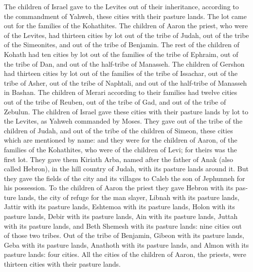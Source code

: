 \begin{paracol}{2}
\begin{otherlanguage}{english}
 The children of Israel gave to the Levites out of their
inheritance, according to the commandment of Yahweh, these cities with
their pasture lands.  The lot came out for the families of
the Kohathites. The children of Aaron the priest, who were of the
Levites, had thirteen cities by lot out of the tribe of Judah, out of
the tribe of the Simeonites, and out of the tribe of Benjamin.
 The rest of the children of Kohath had ten cities by lot
out of the families of the tribe of Ephraim, out of the tribe of Dan,
and out of the half-tribe of Manasseh.  The children of
Gershon had thirteen cities by lot out of the families of the tribe of
Issachar, out of the tribe of Asher, out of the tribe of Naphtali, and
out of the half-tribe of Manasseh in Bashan.  The children
of Merari according to their families had twelve cities out of the tribe
of Reuben, out of the tribe of Gad, and out of the tribe of Zebulun.
 The children of Israel gave these cities with their
pasture lands by lot to the Levites, as Yahweh commanded by Moses.
 They gave out of the tribe of the children of Judah, and
out of the tribe of the children of Simeon, these cities which are
mentioned by name:  and they were for the children of
Aaron, of the families of the Kohathites, who were of the children of
Levi; for theirs was the first lot.  They gave them
Kiriath Arba, named after the father of Anak (also called Hebron), in
the hill country of Judah, with its pasture lands around it.
 But they gave the fields of the city and its villages to
Caleb the son of Jephunneh for his possession.  To the
children of Aaron the priest they gave Hebron with its pasture lands,
the city of refuge for the man slayer, Libnah with its pasture lands,
 Jattir with its pasture lands, Eshtemoa with its pasture
lands,  Holon with its pasture lands, Debir with its
pasture lands,  Ain with its pasture lands, Juttah with
its pasture lands, and Beth Shemesh with its pasture lands: nine cities
out of those two tribes.  Out of the tribe of Benjamin,
Gibeon with its pasture lands, Geba with its pasture lands,
 Anathoth with its pasture lands, and Almon with its
pasture lands: four cities.  All the cities of the
children of Aaron, the priests, were thirteen cities with their pasture
lands.


\end{otherlanguage}
\end{paracol}
